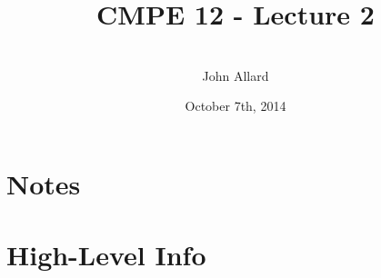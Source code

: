 \documentclass[a4paper,11pt]{article}
\title{CMPE 12 - Lecture 2}
\author{ \\[7in] John Allard}
\date{October 7th, 2014 \\}
\begin{document}
\section{Notes}
 

\section{High-Level Info}
\end{document}
